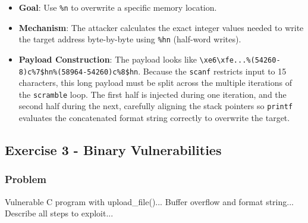 \documentclass{article}
\begin{document}
\begin{itemize}
    \item \textbf{Goal}: Use \texttt{\%n} to overwrite a specific memory location.
    \item \textbf{Mechanism}: The attacker calculates the exact integer values needed to write the target address byte-by-byte using \texttt{\%hn} (half-word writes).
    \item \textbf{Payload Construction}: The payload looks like \texttt{\textbackslash{}xe6\textbackslash{}xfe...\%(54260-8)c\%7\$hn\%(58964-54260)c\%8\$hn}. Because the \texttt{scanf} restricts input to 15 characters, this long payload must be split across the multiple iterations of the \texttt{scramble} loop. The first half is injected during one iteration, and the second half during the next, carefully aligning the stack pointers so \texttt{printf} evaluates the concatenated format string correctly to overwrite the target.
\end{itemize}

\subsection{Exercise 3 - Binary Vulnerabilities}
\subsubsection*{Problem}
Vulnerable C program with upload\_file()... Buffer overflow and format string... Describe all steps to exploit...
\end{document}
